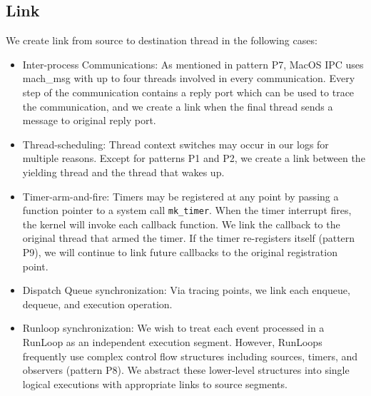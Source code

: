 \subsection{Link}
We create link from source to destination thread in the following cases:
\begin{itemize}
        \item Inter-process Communications: As mentioned in pattern P7, MacOS
        IPC uses mach\_msg with up to four threads involved in every
        communication. Every step of the communication contains a reply port
        which can be used to trace the communication, and we create a link when
        the final thread sends a message to original reply port.

        \item Thread-scheduling: Thread context switches may occur in our logs
        for multiple reasons. Except for patterns P1 and P2, we create a link
        between the yielding thread and the thread that wakes up.

        \item Timer-arm-and-fire: Timers may be registered at any point by
        passing a function pointer to a system call \texttt{mk\_timer}. When
        the timer interrupt fires, the kernel will invoke each callback
        function. We link the callback to the original thread that armed the
        timer. If the timer re-registers itself (pattern P9), we will continue
        to link future callbacks to the original registration point.


        \item Dispatch Queue synchronization: Via tracing points, we link each enqueue,
        dequeue, and execution operation.

        \item Runloop synchronization: We wish to treat each event processed in
        a RunLoop as an independent execution segment. However, RunLoops
        frequently use complex control flow structures including sources,
        timers, and observers (pattern P8). We abstract these lower-level
        structures into single logical executions with appropriate links to
        source segments.


\end{itemize}

